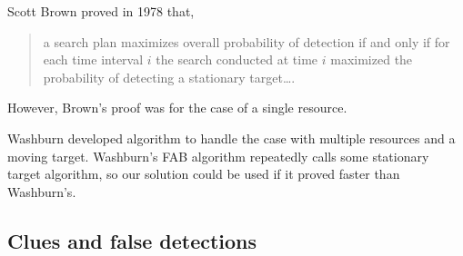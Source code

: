 Scott Brown \cite{brown80:_optimal} proved in 1978 that,
\begin{quotation}
  a search plan maximizes overall probability of detection if and only
  if for each time interval $i$ the search conducted at time $i$
  maximized the probability of detecting a stationary target\ldots.
\end{quotation}
However, Brown's proof was for the case of a single resource.

Washburn \cite{washburn83:_fab} developed  algorithm to handle the
case with multiple resources and a moving target. Washburn's FAB
algorithm repeatedly calls some stationary target algorithm, so our
solution could be used if it proved faster than Washburn's.


\subsection{Clues and false detections}
\label{sec:false}


